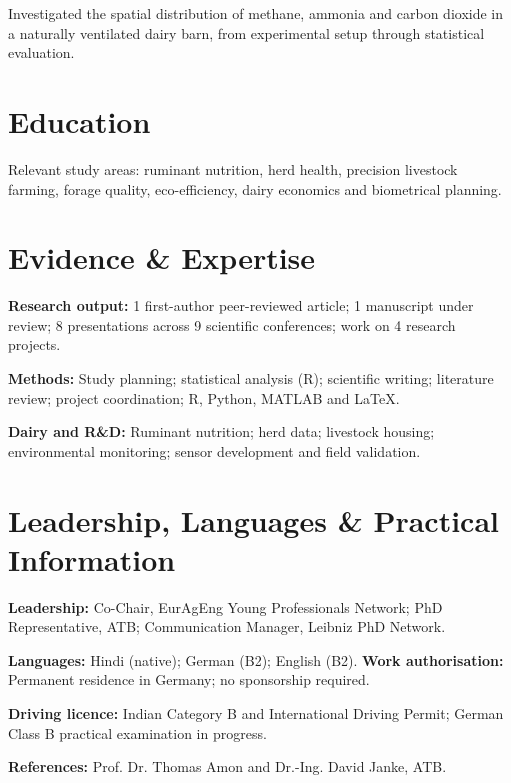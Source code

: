 \begin{cvitems}
  \item Investigated the spatial distribution of methane, ammonia and carbon dioxide in a naturally ventilated dairy barn, from experimental setup through statistical evaluation.
\end{cvitems}

\section*{Education}
Relevant study areas: ruminant nutrition, herd health, precision livestock farming, forage quality, eco-efficiency, dairy economics and biometrical planning.


\section*{Evidence \& Expertise}
\textbf{Research output:} 1 first-author peer-reviewed article; 1 manuscript under review; 8 presentations across 9 scientific conferences; work on 4 research projects.\par
\textbf{Methods:} Study planning; statistical analysis (R); scientific writing; literature review; project coordination; R, Python, MATLAB and LaTeX.\par
\textbf{Dairy and R\&D:} Ruminant nutrition; herd data; livestock housing; environmental monitoring; sensor development and field validation.

\section*{Leadership, Languages \& Practical Information}
\textbf{Leadership:} Co-Chair, EurAgEng Young Professionals Network; PhD Representative, ATB; Communication Manager, Leibniz PhD Network.\par
\textbf{Languages:} Hindi (native); German (B2); English (B2). \quad
\textbf{Work authorisation:} Permanent residence in Germany; no sponsorship required.\par
\textbf{Driving licence:} Indian Category B and International Driving Permit; German Class B practical examination in progress.\par
\textbf{References:} Prof. Dr. Thomas Amon and Dr.-Ing. David Janke, ATB.


